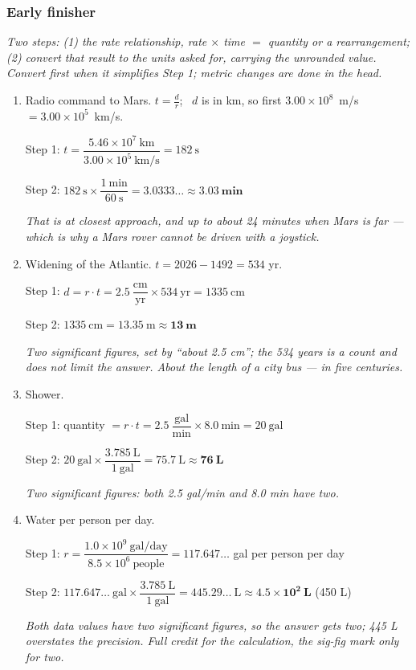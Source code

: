 \documentclass[12pt, twoside]{article}
\begin{document}
\subsubsection*{Early finisher}

\emph{Two steps: (1) the rate relationship, rate $\times$ time $=$ quantity or a
rearrangement; (2) convert that result to the units asked for, carrying the unrounded
value. Convert first when it simplifies Step 1; metric changes are done in the head.}

\begin{enumerate}[resume, itemsep=0.1cm]

\item Radio command to Mars. \quad $t = \frac{d}{r}$; \, $d$ is in km, so first
  \mbox{$3.00 \times 10^{8}$ m/s $= 3.00 \times 10^{5}$ km/s.}

  Step 1: \quad $t = \dfrac{5.46 \times 10^{7}~\text{km}}{3.00 \times 10^{5}~\text{km/s}}
  = 182~\text{s}$

  Step 2: \quad $182~\text{s} \times \dfrac{1~\text{min}}{60~\text{s}} = 3.0333\ldots
  \approx \mathbf{3.03~\textbf{min}}$

  \emph{That is at closest approach, and up to about 24 minutes when Mars is far ---
  which is why a Mars rover cannot be driven with a joystick.}

\item Widening of the Atlantic. \quad $t = 2026 - 1492 = 534$ yr.

  Step 1: \quad $d = r \cdot t = 2.5~\dfrac{\text{cm}}{\text{yr}} \times 534~\text{yr}
  = 1335~\text{cm}$

  Step 2: \quad $1335~\text{cm} = 13.35~\text{m} \approx \mathbf{13~\textbf{m}}$

  \emph{Two significant figures, set by ``about 2.5 cm''; the 534 years is a count and
  does not limit the answer. About the length of a city bus --- in five centuries.}

\item Shower.

  Step 1: \quad quantity $= r \cdot t = 2.5~\dfrac{\text{gal}}{\text{min}} \times
  8.0~\text{min} = 20~\text{gal}$

  Step 2: \quad $20~\text{gal} \times \dfrac{3.785~\text{L}}{1~\text{gal}} = 75.7~\text{L}
  \approx \mathbf{76~\textbf{L}}$

  \emph{Two significant figures: both 2.5 gal/min and 8.0 min have two.}

\item Water per person per day.

  Step 1: \quad $r = \dfrac{1.0 \times 10^{9}~\text{gal/day}}{8.5 \times 10^{6}~\text{people}}
  = 117.647\ldots$ gal per person per day

  Step 2: \quad $117.647\ldots~\text{gal} \times \dfrac{3.785~\text{L}}{1~\text{gal}}
  = 445.29\ldots~\text{L} \approx \mathbf{4.5 \times 10^{2}~\textbf{L}}$
  (450 L)

  \emph{Both data values have two significant figures, so the answer gets two; 445 L
  overstates the precision. Full credit for the calculation, the sig-fig mark only for two.}

\end{enumerate}
\end{document}
